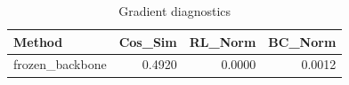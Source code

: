 \begin{table}[htbp]
\centering
\caption{Gradient diagnostics}
\label{tab:grad-diag}
\begin{tabular}{lrrr}
\toprule
\textbf{Method} & \textbf{Cos\_Sim} & \textbf{RL\_Norm} & \textbf{BC\_Norm} \\
\midrule
frozen\_backbone & 0.4920 & 0.0000 & 0.0012 \\
\bottomrule
\end{tabular}
\end{table}